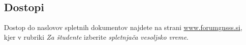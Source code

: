 


\subsection{Dostopi}
Dostop do naslovov spletnih dokumentov najdete na strani \url{www.forumgnsss.si}, kjer v rubriki \textit{Za študente} izberite \textit{spletnjača vesoljsko vreme}.


